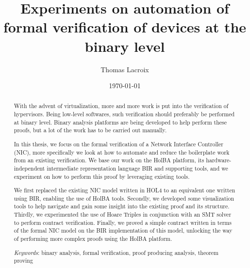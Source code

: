 \documentclass{kththesis}
\title{Experiments on automation of formal verification of devices at the binary level}
\author{Thomas Lacroix}
\date{\today}
\begin{document}
\frontmatter %

\titlepage

\begin{abstract}
  With the advent of virtualization, more and more work is put into the verification of hypervisors. Being low-level softwares, such verification should preferably be performed at binary level. Binary analysis platforms are being developed to help perform these proofs, but a lot of the work has to be carried out manually.

  In this thesis, we focus on the formal verification of a Network Interface Controller (NIC), more specifically we look at how to automate and reduce the boilerplate work from an existing verification. We base our work on the HolBA platform, its hardware-independent intermediate representation language BIR and supporting tools, and we experiment on how to perform this proof by leveraging existing tools.

  We first replaced the existing NIC model written in HOL4 to an equivalent one written using BIR, enabling the use of HolBA tools. Secondly, we developed some visualization tools to help navigate and gain some insight into the existing proof and its structure. Thirdly, we experimented the use of Hoare Triples in conjunction with an SMT solver to perform contract verification. Finally, we proved a simple contract written in terms of the formal NIC model on the BIR implementation of this model, unlocking the way of performing more complex proofs using the HolBA platform.

  \textit{Keywords}: binary analysis, formal verification, proof producing analysis, theorem proving
\end{abstract}
\end{document}
